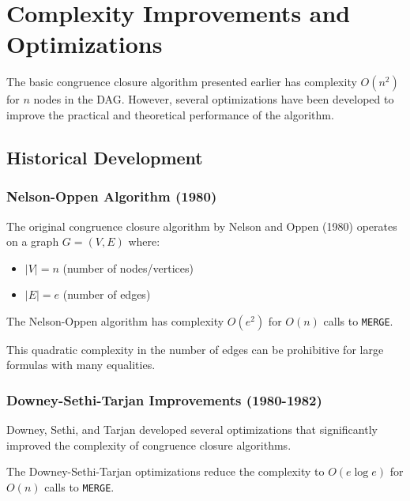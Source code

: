 \documentclass[11pt,a4paper]{article}
\theoremstyle{definition}
\theoremstyle{plain}
\theoremstyle{remark}
\begin{document}
\section{Complexity Improvements and Optimizations}

The basic congruence closure algorithm presented earlier has complexity $O(n^2)$ for $n$ nodes in the DAG. However, several optimizations have been developed to improve the practical and theoretical performance of the algorithm.

\subsection{Historical Development}

\subsubsection{Nelson-Oppen Algorithm (1980)}

The original congruence closure algorithm by Nelson and Oppen (1980) operates on a graph $G = (V, E)$ where:
\begin{itemize}
    \item $|V| = n$ (number of nodes/vertices)
    \item $|E| = e$ (number of edges)
\end{itemize}

\begin{tcolorbox}[colback=orange!5!white,colframe=orange!75!black,title=\textbf{Nelson-Oppen Complexity}]
The Nelson-Oppen algorithm has complexity $O(e^2)$ for $O(n)$ calls to \texttt{MERGE}.
\end{tcolorbox}

This quadratic complexity in the number of edges can be prohibitive for large formulas with many equalities.

\subsubsection{Downey-Sethi-Tarjan Improvements (1980-1982)}

Downey, Sethi, and Tarjan developed several optimizations that significantly improved the complexity of congruence closure algorithms.

\begin{tcolorbox}[colback=green!5!white,colframe=green!75!black,title=\textbf{Improved Complexity}]
The Downey-Sethi-Tarjan optimizations reduce the complexity to $O(e \log e)$ for $O(n)$ calls to \texttt{MERGE}.
\end{tcolorbox}
\end{document}
